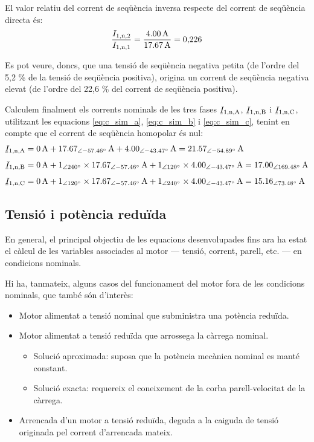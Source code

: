 \begin{exemple}
	El valor relatiu del corrent de seqüència inversa respecte del corrent de seqüència directa és:
	\[
		\frac{I_\mathrm{1,n,2}}{I_\mathrm{1,n,1}} = \frac{\qty{4,00}{A}}{\qty{17,67}{A}} = 0{,}226
	\]	
	
	Es pot veure, doncs, que una tensió de seqüència negativa petita (de l'ordre del 5,2 \% de la tensió de seqüència positiva), origina un corrent de seqüència negativa elevat (de l'ordre del 22,6 \% del corrent de seqüència positiva). 
	
	Calculem finalment els corrents nominals de les tres fases $\cmplx{I}\ped{1,n,A}$, $\cmplx{I}\ped{1,n,B}$ i $\cmplx{I}\ped{1,n,C}$, utilitzant les equacions \eqref{eq:c_sim_a},
	\eqref{eq:c_sim_b} i \eqref{eq:c_sim_c}, tenint en compte que el corrent de seqüència homopolar és nul:
	\begin{align*}
		\cmplx{I}\ped{1,n,A} &= \qty{0}{A} + \qtypd{17,67}{-57,46}{A} +
		\qtypd{4,00}{-43,47}{A}  =
		\qtypd{21,57}{-54,89}{A} \\[1ex]
		\cmplx{I}\ped{1,n,B} &= \qty{0}{A} + \numpd{1}{240} \times
		\qtypd{17,67}{-57,46}{A} + \numpd{1}{120} \times
		\qtypd{4,00}{-43,47}{A}  =
		\qtypd{17,00}{169,48}{A}    \\[1ex]
		\cmplx{I}\ped{1,n,C} &= \qty{0}{A} + \numpd{1}{120} \times
		\qtypd{17,67}{-57,46}{A} +
		\numpd{1}{240} \times \qtypd{4,00}{-43,47}{A}  =
		\qtypd{15,16}{73,48}{A}
\end{align*}
	
\end{exemple}
	

\subsection{Tensió i potència reduïda}\label{sec:mot-tens-pot-red}

En general, el principal objectiu de les equacions desenvolupades fins ara ha estat  el càlcul de les variables associades al motor --- tensió, corrent, parell, etc. --- en condicions nominals.

Hi ha, tanmateix, alguns casos del funcionament del motor fora de les condicions nominals, que també són d'interès: 
\begin{itemize}
	\item  Motor alimentat a tensió nominal que subministra una potència reduïda.
	\item  Motor alimentat a tensió reduïda que arrossega la càrrega nominal.
	\begin{itemize}
		\item Solució aproximada: suposa que la potència mecànica nominal es manté constant.
		\item Solució exacta: requereix el coneixement de la corba parell-velocitat de la càrrega.
	\end{itemize}	
	\item Arrencada d'un motor a tensió reduïda, deguda a la caiguda de tensió originada pel corrent d'arrencada mateix.
\end{itemize}

